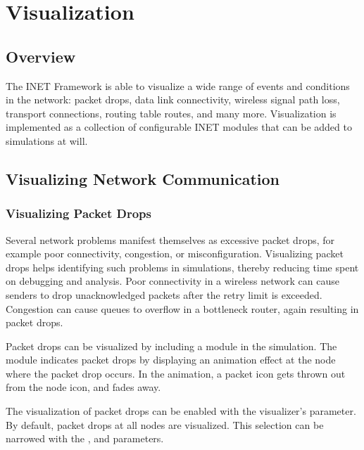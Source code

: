 \chapter{Visualization}
\label{cha:visualization}

\section{Overview}
\label{sec:visualization:overview}

The INET Framework is able to visualize a wide range of events and conditions
in the network: packet drops, data link connectivity, wireless signal path loss,
transport connections, routing table routes, and many more. Visualization is
implemented as a collection of configurable INET modules that can be added
to simulations at will.

\section{Visualizing Network Communication}
\label{sec:visualization:network-communication}

\subsection{Visualizing Packet Drops}
\label{sec:visualization:packet-drops}

Several network problems manifest themselves as excessive packet drops, for
example poor connectivity, congestion, or misconfiguration. Visualizing packet
drops helps identifying such problems in simulations, thereby reducing time
spent on debugging and analysis. Poor connectivity in a wireless network can
cause senders to drop unacknowledged packets after the retry limit is exceeded.
Congestion can cause queues to overflow in a bottleneck router, again resulting
in packet drops.

Packet drops can be visualized by including a 
module in the simulation. The  module indicates
packet drops by displaying an animation effect at the node where the packet drop
occurs. In the animation, a packet icon gets thrown out from the node icon, and
fades away.

The visualization of packet drops can be enabled with the visualizer's
 parameter. By default, packet drops at all nodes are
visualized. This selection can be narrowed with the ,
 and  parameters.

